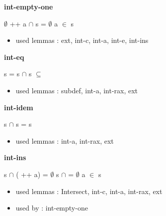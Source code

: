 \documentclass[a4paper]{article}
\begin{document}
\medskip

\bigskip

{\large\bf int-empty-one}

\medskip

 \Fol $\emptyset$ ++ a $\cap$ s = $\emptyset$ \Equiv \Not a $\in$ s

\begin{itemize}


\item       used lemmas  : ext, int-c, int-a, int-e, int-ins

\end{itemize}

\medskip

\bigskip

{\large\bf int-eq}

\medskip

 \Fol s = s $\cap$  \Equiv s $\subseteq$ 

\begin{itemize}


\item       used lemmas  : subdef, int-a, int-rax, ext

\end{itemize}

\medskip

\bigskip

{\large\bf int-idem}

\medskip

 \Fol s $\cap$ s = s

\begin{itemize}


\item       used lemmas  : int-a, int-rax, ext

\end{itemize}

\medskip

\bigskip

{\large\bf int-ins}

\medskip

 \Fol s $\cap$ ( ++ a) = $\emptyset$ \Equiv s $\cap$  = $\emptyset$ \And \Not a $\in$ s

\begin{itemize}


\item       used lemmas  : Intersect, int-c, int-a, int-rax, ext
\item       used by      : int-empty-one

\end{itemize}
\end{document}
